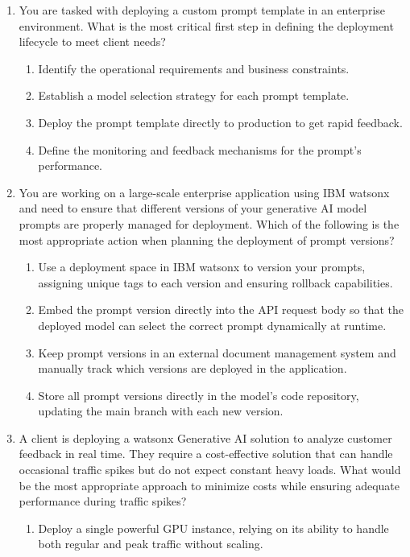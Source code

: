 \begin{enumerate}[resume,leftmargin=*]
\item You are tasked with deploying a custom prompt template in an enterprise environment. What is the most critical first step in defining the deployment lifecycle to meet client needs?
\begin{enumerate}[label=\Alph*.]
  \item Identify the operational requirements and business constraints.
  \item Establish a model selection strategy for each prompt template.
  \item Deploy the prompt template directly to production to get rapid feedback.
  \item Define the monitoring and feedback mechanisms for the prompt's performance.
\end{enumerate}
\item You are working on a large-scale enterprise application using IBM watsonx and need to ensure that different versions of your generative AI model prompts are properly managed for deployment. Which of the following is the most appropriate action when planning the deployment of prompt versions?
\begin{enumerate}[label=\Alph*.]
  \item Use a deployment space in IBM watsonx to version your prompts, assigning unique tags to each version and ensuring rollback capabilities.
  \item Embed the prompt version directly into the API request body so that the deployed model can select the correct prompt dynamically at runtime.
  \item Keep prompt versions in an external document management system and manually track which versions are deployed in the application.
  \item Store all prompt versions directly in the model's code repository, updating the main branch with each new version.
\end{enumerate}
\item A client is deploying a watsonx Generative AI solution to analyze customer feedback in real time. They require a cost-effective solution that can handle occasional traffic spikes but do not expect constant heavy loads. What would be the most appropriate approach to minimize costs while ensuring adequate performance during traffic spikes?
\begin{enumerate}[label=\Alph*.]
  \item Deploy a single powerful GPU instance, relying on its ability to handle both regular and peak traffic without scaling.

\end{enumerate}
\end{enumerate}
